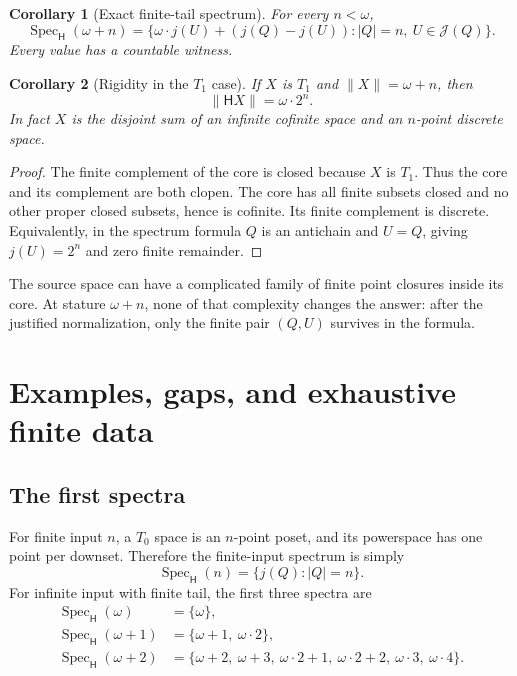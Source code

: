 \documentclass[11pt,a4paper]{article}
\newtheorem{corollary}[corollary]{Corollary}
\theoremstyle{definition}
\newcommand{\HH}{\mathsf H}
\newcommand{\JJ}{\mathcal J}
\newcommand{\st}[1]{\lVert #1\rVert}
\newcommand{\Spec}{\operatorname{Spec}_{\HH}}
\numberwithin{equation}{section}
\begin{document}
\begin{corollary}[Exact finite-tail spectrum]\label{cor:spectrum}
For every $n<\omega$,
\[
 \Spec(\omega+n)=
 \{\omega\cdot j(U)+(j(Q)-j(U)):
                    |Q|=n,\ U\in\JJ(Q)\}.
\]
Every value has a countable witness.
\end{corollary}

\begin{corollary}[Rigidity in the $T_1$ case]\label{cor:T1tail}
If $X$ is $T_1$ and $\st X=\omega+n$, then
\[
 \st{\HH X}=\omega\cdot2^n.
\]
In fact $X$ is the disjoint sum of an infinite cofinite space and an
$n$-point discrete space.
\end{corollary}
\begin{proof}
The finite complement of the core is closed because $X$ is $T_1$.
Thus the core and its complement are both clopen.  The core has all
finite subsets closed and no other proper closed subsets, hence is
cofinite.  Its finite complement is discrete.  Equivalently, in the
spectrum formula $Q$ is an antichain and $U=Q$, giving $j(U)=2^n$ and
zero finite remainder.
\end{proof}

The source space can have a complicated family of finite point closures
inside its core.  At stature $\omega+n$, none of that complexity changes
the answer: after the justified normalization, only the finite pair
$(Q,U)$ survives in the formula.

\section{Examples, gaps, and exhaustive finite data}
\label{sec:examples}

\subsection{The first spectra}

For finite input $n$, a $T_0$ space is an $n$-point poset, and its
powerspace has one point per downset.  Therefore the finite-input
spectrum is simply
\[
 \Spec(n)=\{j(Q):|Q|=n\}.
\]
For infinite input with finite tail, the first three spectra are
\begin{align*}
 \Spec(\omega)&=\{\omega\},\\
 \Spec(\omega+1)&=\{\omega+1,\ \omega\cdot2\},\\
 \Spec(\omega+2)&=\{\omega+2,\ \omega+3,\ \omega\cdot2+1,\
                   \omega\cdot2+2,\ \omega\cdot3,\ \omega\cdot4\}.
\end{align*}
\end{document}
